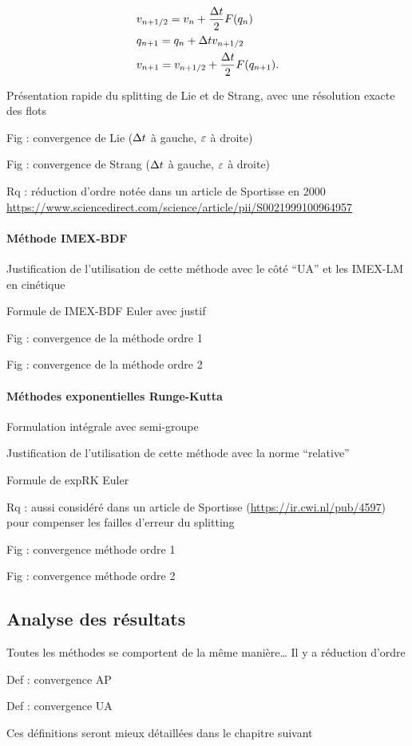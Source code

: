 \bigskip\bigskip\bigskip
{}
\vspace*{-2\bigskipamount}
\begin{align*}
&   v_{n + 1/2} = v_n + \frac{\Delta t}{2}F(q_n) \\
&   q_{n+1} = q_n + \Delta t v_{n+1/2} \\
&   v_{n+1} = v_{n+1/2} + \frac{\Delta t}{2}F(q_{n+1}) .
\end{align*}
\vspace*{-\medskipamount}

Présentation rapide du splitting de Lie et de Strang, avec une résolution exacte des flots

Fig : convergence de Lie ($\Delta t$ à gauche, $\varepsilon$ à droite)

Fig : convergence de Strang ($\Delta t$ à gauche, $\varepsilon$ à droite)

Rq : réduction d’ordre notée dans un article de Sportisse en 2000 \url{https://www.sciencedirect.com/science/article/pii/S0021999100964957}


\paragraph{Méthode IMEX-BDF}

Justification de l’utilisation de cette méthode avec le côté “UA” et les IMEX-LM en cinétique

Formule de IMEX-BDF Euler avec justif

Fig : convergence de la méthode ordre 1

Fig : convergence de la méthode ordre 2


\paragraph{Méthodes exponentielles Runge-Kutta}

Formulation intégrale avec semi-groupe

Justification de l’utilisation de cette méthode avec la norme “relative”

Formule de expRK Euler

Rq : aussi considéré dans un article de Sportisse (\url{https://ir.cwi.nl/pub/4597}) pour compenser les failles d’erreur du splitting

Fig : convergence méthode ordre 1

Fig : convergence méthode ordre 2


\subsection*{Analyse des résultats}

Toutes les méthodes se comportent de la même manière… Il y a réduction d’ordre

Def : convergence AP

Def : convergence UA

Ces définitions seront mieux détaillées dans le chapitre suivant
